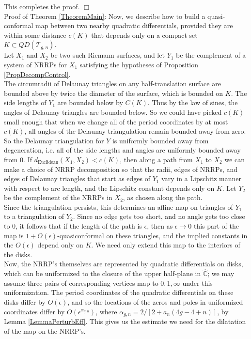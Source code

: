 \documentclass[12pt]{article}
\newcommand{\cc}{\mathbb{C}}
\begin{document}
\noindent This completes the proof. $\Box$\\

\noindent Proof of Theorem \ref{TheoremMain}: \noindent Now, we describe how to build a quasi-conformal map between two nearby quadratic differentials, provided they are within some distance $c(K)$ that depends only on a compact set $K \subset QD(\mathcal{T}_{g,n})$.\\

\noindent Let $X_1$ and $X_2$ be two such Riemann surfaces, and let $Y_1$ be the complement of a system of NRRPs for $X_1$ satisfying the hypotheses of Proposition \ref{PropDecompControl}.\\

\noindent The circumradii of Delaunay triangles on any half-translation surface are bounded above by twice the diameter of the surface, which is bounded on $K$. The side lengths of $Y_1$ are bounded below by $C(K)$. Thus by the law of sines, the angles of Delaunay triangles are bounded below. So we could have picked $c(K)$ small enough that when we change all of the period coordinates by at most $c(K)$, all angles of the Delaunay triangulation remain bounded away from zero. So the Delaunay triangulation for $Y$ is uniformly bounded away from degeneration, i.e. all of the side lengths and angles are uniformly bounded away from $0$. If $d_\mathrm{Euclidean}(X_1,X_2) < c(K)$, then along a path from $X_1$ to $X_2$ we can make a choice of NRRP decomposition so that the radii, edges of NRRPs, and edges of Delaunay triangles that start as edges of $Y_1$ vary in a Lipschitz manner with respect to arc length, and the Lipschitz constant depends only on $K$. Let $Y_2$ be the complement of the NRRPs in $X_2$, as chosen along the path.\\

\noindent Since the triangulation persists, this determines an affine map on triangles of $Y_1$ to a triangulation of $Y_2$. Since no edge gets too short, and no angle gets too close to $0$, it follows that if the length of the path is $\epsilon$, then as $\epsilon \to 0$ this part of the map is $1 + O(\epsilon)$-quasiconformal on these triangles, and the implied constants in the $O(\epsilon)$ depend only on $K$. We need only extend this map to the interiors of the disks.\\

\noindent Now, the NRRP's themselves are represented by quadratic differentials on disks, which can be uniformized to the closure of the upper half-plane in $\hat{\cc}$; we may assume three pairs of corresponding vertices map to $0,1,\infty$ under this uniformization. The period coordinates of the quadratic differentials on these disks differ by $O(\epsilon)$, and so the locations of the zeros and poles in uniformized coordinates differ by $O(\epsilon^{\alpha_{g,n}})$, where $\alpha_{g,n} = {2/[2 + a_n(4g-4 + n)]}$, by Lemma \ref{LemmaPerturbEff}. This gives us the estimate we need for the dilatation of the map on the NRRP's.\\
\end{document}
